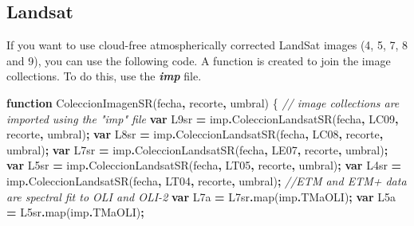 \documentclass[
]{book}
\newenvironment{Shaded}{\begin{snugshade}}{\end{snugshade}}
\newcommand{\AttributeTok}[1]{\textcolor[rgb]{0.77,0.63,0.00}{#1}}
\newcommand{\CommentTok}[1]{\textcolor[rgb]{0.56,0.35,0.01}{\textit{#1}}}
\newcommand{\FunctionTok}[1]{\textcolor[rgb]{0.00,0.00,0.00}{#1}}
\newcommand{\KeywordTok}[1]{\textcolor[rgb]{0.13,0.29,0.53}{\textbf{#1}}}
\newcommand{\NormalTok}[1]{#1}
\newcommand{\OperatorTok}[1]{\textcolor[rgb]{0.81,0.36,0.00}{\textbf{#1}}}
\newcommand{\StringTok}[1]{\textcolor[rgb]{0.31,0.60,0.02}{#1}}
\begin{document}
\hypertarget{landsat}{%
\subsection{Landsat}\label{landsat}}

If you want to use cloud-free atmospherically corrected LandSat images (4, 5, 7, 8 and 9), you can use the following code. A function is created to join the image collections. To do this, use the \textbf{\emph{imp}} file.

\begin{Shaded}
\begin{Highlighting}[]
\KeywordTok{function} \FunctionTok{ColeccionImagenSR}\NormalTok{(fecha}\OperatorTok{,}\NormalTok{ recorte}\OperatorTok{,}\NormalTok{ umbral)}
\NormalTok{\{}
  \CommentTok{// image collections are imported using the "imp" file}
  \KeywordTok{var}\NormalTok{ L9sr }\OperatorTok{=}\NormalTok{ imp}\OperatorTok{.}\FunctionTok{ColeccionLandsatSR}\NormalTok{(fecha}\OperatorTok{,} \StringTok{\textquotesingle{}LC09\textquotesingle{}}\OperatorTok{,}\NormalTok{ recorte}\OperatorTok{,}\NormalTok{ umbral)}\OperatorTok{;}
  \KeywordTok{var}\NormalTok{ L8sr }\OperatorTok{=}\NormalTok{ imp}\OperatorTok{.}\FunctionTok{ColeccionLandsatSR}\NormalTok{(fecha}\OperatorTok{,} \StringTok{\textquotesingle{}LC08\textquotesingle{}}\OperatorTok{,}\NormalTok{ recorte}\OperatorTok{,}\NormalTok{ umbral)}\OperatorTok{;}
  \KeywordTok{var}\NormalTok{ L7sr }\OperatorTok{=}\NormalTok{ imp}\OperatorTok{.}\FunctionTok{ColeccionLandsatSR}\NormalTok{(fecha}\OperatorTok{,} \StringTok{\textquotesingle{}LE07\textquotesingle{}}\OperatorTok{,}\NormalTok{ recorte}\OperatorTok{,}\NormalTok{ umbral)}\OperatorTok{;}
  \KeywordTok{var}\NormalTok{ L5sr }\OperatorTok{=}\NormalTok{ imp}\OperatorTok{.}\FunctionTok{ColeccionLandsatSR}\NormalTok{(fecha}\OperatorTok{,} \StringTok{\textquotesingle{}LT05\textquotesingle{}}\OperatorTok{,}\NormalTok{ recorte}\OperatorTok{,}\NormalTok{ umbral)}\OperatorTok{;}
  \KeywordTok{var}\NormalTok{ L4sr }\OperatorTok{=}\NormalTok{ imp}\OperatorTok{.}\FunctionTok{ColeccionLandsatSR}\NormalTok{(fecha}\OperatorTok{,} \StringTok{\textquotesingle{}LT04\textquotesingle{}}\OperatorTok{,}\NormalTok{ recorte}\OperatorTok{,}\NormalTok{ umbral)}\OperatorTok{;}
  \CommentTok{//ETM and ETM+ data are spectral fit to OLI and OLI{-}2 }
  \KeywordTok{var}\NormalTok{ L7a }\OperatorTok{=}\NormalTok{ L7sr}\OperatorTok{.}\FunctionTok{map}\NormalTok{(imp}\OperatorTok{.}\AttributeTok{TMaOLI}\NormalTok{)}\OperatorTok{;}
  \KeywordTok{var}\NormalTok{ L5a }\OperatorTok{=}\NormalTok{ L5sr}\OperatorTok{.}\FunctionTok{map}\NormalTok{(imp}\OperatorTok{.}\AttributeTok{TMaOLI}\NormalTok{)}\OperatorTok{;}

\end{Highlighting}
\end{Shaded}
\end{document}
